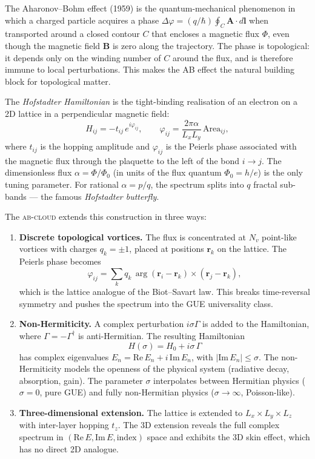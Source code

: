 \documentclass[11pt,a4paper]{article}
\theoremstyle{plain}
\theoremstyle{definition}
\theoremstyle{remark}
\newcommand{\Abcloud}{\textsc{ab-cloud}}
\begin{document}
The Aharonov--Bohm effect (1959) is the quantum-mechanical phenomenon in which a charged particle acquires a phase $\Delta\varphi = (q/\hbar)\oint_C \mathbf{A}\cdot d\mathbf{l}$ when transported around a closed contour $C$ that encloses a magnetic flux $\Phi$, even though the magnetic field $\mathbf{B}$ is zero along the trajectory. The phase is topological: it depends only on the winding number of $C$ around the flux, and is therefore immune to local perturbations. This makes the AB effect the natural building block for topological matter.

The \emph{Hofstadter Hamiltonian} is the tight-binding realisation of an electron on a 2D lattice in a perpendicular magnetic field:
\begin{equation}\label{eq:Hofstadter}
    H_{ij} = -t_{ij}\,e^{i\varphi_{ij}}, \qquad \varphi_{ij} = \frac{2\pi\alpha}{L_x L_y}\,\mathrm{Area}_{ij},
\end{equation}
where $t_{ij}$ is the hopping amplitude and $\varphi_{ij}$ is the Peierls phase associated with the magnetic flux through the plaquette to the left of the bond $i\to j$. The dimensionless flux $\alpha = \Phi/\Phi_0$ (in units of the flux quantum $\Phi_0 = h/e$) is the only tuning parameter. For rational $\alpha = p/q$, the spectrum splits into $q$ fractal sub-bands — the famous \emph{Hofstadter butterfly}.

The \Abcloud{} extends this construction in three ways:
\begin{enumerate}[leftmargin=*,itemsep=2pt]
    \item \textbf{Discrete topological vortices.} The flux is concentrated at $N_v$ point-like vortices with charges $q_k = \pm 1$, placed at positions $\mathbf{r}_k$ on the lattice. The Peierls phase becomes
    \begin{equation}
        \varphi_{ij} = \sum_k q_k\,\arg(\mathbf{r}_i - \mathbf{r}_k) \times (\mathbf{r}_j - \mathbf{r}_k),
    \end{equation}
    which is the lattice analogue of the Biot--Savart law. This breaks time-reversal symmetry and pushes the spectrum into the GUE universality class.
    \item \textbf{Non-Hermiticity.} A complex perturbation $i\sigma\Gamma$ is added to the Hamiltonian, where $\Gamma = -\Gamma^\dagger$ is anti-Hermitian. The resulting Hamiltonian
    \begin{equation}\label{eq:nonHerm}
        H(\sigma) = H_0 + i\sigma\,\Gamma
    \end{equation}
    has complex eigenvalues $E_n = \mathrm{Re}\,E_n + i\,\mathrm{Im}\,E_n$, with $|\mathrm{Im}\,E_n| \le \sigma$. The non-Hermiticity models the openness of the physical system (radiative decay, absorption, gain). The parameter $\sigma$ interpolates between Hermitian physics ($\sigma=0$, pure GUE) and fully non-Hermitian physics ($\sigma\to\infty$, Poisson-like).
    \item \textbf{Three-dimensional extension.} The lattice is extended to $L_x\times L_y\times L_z$ with inter-layer hopping $t_z$. The 3D extension reveals the full complex spectrum in $(\mathrm{Re}\,E, \mathrm{Im}\,E, \mathrm{index})$ space and exhibits the 3D skin effect, which has no direct 2D analogue.
\end{enumerate}
\end{document}
